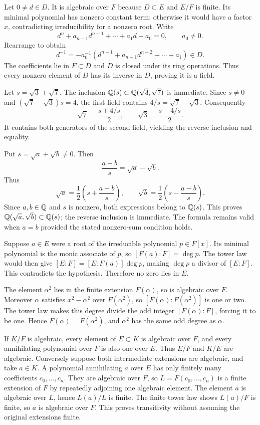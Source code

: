 Let $0\ne d\in D$. It is algebraic over $F$ because $D\subset E$ and $E/F$ is finite. Its minimal polynomial has nonzero constant term: otherwise it would have a factor $x$, contradicting irreducibility for a nonzero root. Write
\[d^n+a_{n-1}d^{n-1}+\cdots+a_1d+a_0=0,\qquad a_0\ne0.\]
Rearrange to obtain
\[d^{-1}=-a_0^{-1}(d^{n-1}+a_{n-1}d^{n-2}+\cdots+a_1)\in D.\]
The coefficients lie in $F\subset D$ and $D$ is closed under its ring operations. Thus every nonzero element of $D$ has its inverse in $D$, proving it is a field.

Let $s=\sqrt3+\sqrt7$. The inclusion $\mathbb{Q}(s)\subset\mathbb{Q}(\sqrt3,\sqrt7)$ is immediate. Since $s\ne0$ and $(\sqrt7-\sqrt3)s=4$, the first field contains $4/s=\sqrt7-\sqrt3$. Consequently
\[\sqrt7=\frac{s+4/s}{2},\qquad\sqrt3=\frac{s-4/s}{2}.\]
It contains both generators of the second field, yielding the reverse inclusion and equality.

Put $s=\sqrt a+\sqrt b\ne0$. Then
\[\frac{a-b}{s}=\sqrt a-\sqrt b.\]
Thus
\[\sqrt a=\frac12\left(s+\frac{a-b}{s}\right),\qquad\sqrt b=\frac12\left(s-\frac{a-b}{s}\right).\]
Since $a,b\in\mathbb{Q}$ and $s$ is nonzero, both expressions belong to $\mathbb{Q}(s)$. This proves $\mathbb{Q}(\sqrt a,\sqrt b)\subset\mathbb{Q}(s)$; the reverse inclusion is immediate. The formula remains valid when $a=b$ provided the stated nonzero-sum condition holds.

Suppose $a\in E$ were a root of the irreducible polynomial $p\in F[x]$. Its minimal polynomial is the monic associate of $p$, so $[F(a):F]=\deg p$. The tower law would then give $[E:F]=[E:F(a)]\deg p$, making $\deg p$ a divisor of $[E:F]$. This contradicts the hypothesis. Therefore no zero lies in $E$.

The element $\alpha^2$ lies in the finite extension $F(\alpha)$, so is algebraic over $F$. Moreover $\alpha$ satisfies $x^2-\alpha^2$ over $F(\alpha^2)$, so $[F(\alpha):F(\alpha^2)]$ is one or two. The tower law makes this degree divide the odd integer $[F(\alpha):F]$, forcing it to be one. Hence $F(\alpha)=F(\alpha^2)$, and $\alpha^2$ has the same odd degree as $\alpha$.

If $K/F$ is algebraic, every element of $E\subset K$ is algebraic over $F$, and every annihilating polynomial over $F$ is also one over $E$. Thus $E/F$ and $K/E$ are algebraic.
Conversely suppose both intermediate extensions are algebraic, and take $a\in K$. A polynomial annihilating $a$ over $E$ has only finitely many coefficients $c_0,\ldots,c_n$. They are algebraic over $F$, so $L=F(c_0,\ldots,c_n)$ is a finite extension of $F$ by repeatedly adjoining one algebraic element. The element $a$ is algebraic over $L$, hence $L(a)/L$ is finite. The finite tower law shows $L(a)/F$ is finite, so $a$ is algebraic over $F$. This proves transitivity without assuming the original extensions finite.

